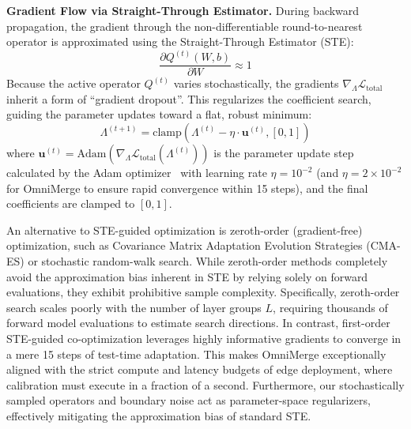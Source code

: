 \textbf{Gradient Flow via Straight-Through Estimator.}
During backward propagation, the gradient through the non-differentiable round-to-nearest operator is approximated using the Straight-Through Estimator (STE):
\begin{equation}
    \frac{\partial Q^{(t)}(W, b)}{\partial W} \approx 1
\end{equation}
Because the active operator $Q^{(t)}$ varies stochastically, the gradients $\nabla_{\Lambda} \mathcal{L}_{\text{total}}$ inherit a form of ``gradient dropout''. This regularizes the coefficient search, guiding the parameter updates toward a flat, robust minimum:
\begin{equation}
    \Lambda^{(t+1)} = \text{clamp}\left( \Lambda^{(t)} - \eta \cdot \mathbf{u}^{(t)}, [0, 1] \right)
\end{equation}
where $\mathbf{u}^{(t)} = \text{Adam}\left( \nabla_{\Lambda} \mathcal{L}_{\text{total}}(\Lambda^{(t)}) \right)$ is the parameter update step calculated by the Adam optimizer~\cite{kingma14adam} with learning rate $\eta = 10^{-2}$ (and $\eta = 2 \times 10^{-2}$ for OmniMerge to ensure rapid convergence within 15 steps), and the final coefficients are clamped to $[0, 1]$.

An alternative to STE-guided optimization is zeroth-order (gradient-free) optimization, such as Covariance Matrix Adaptation Evolution Strategies (CMA-ES) or stochastic random-walk search. While zeroth-order methods completely avoid the approximation bias inherent in STE by relying solely on forward evaluations, they exhibit prohibitive sample complexity. Specifically, zeroth-order search scales poorly with the number of layer groups $L$, requiring thousands of forward model evaluations to estimate search directions. In contrast, first-order STE-guided co-optimization leverages highly informative gradients to converge in a mere 15 steps of test-time adaptation. This makes OmniMerge exceptionally aligned with the strict compute and latency budgets of edge deployment, where calibration must execute in a fraction of a second. Furthermore, our stochastically sampled operators and boundary noise act as parameter-space regularizers, effectively mitigating the approximation bias of standard STE.
